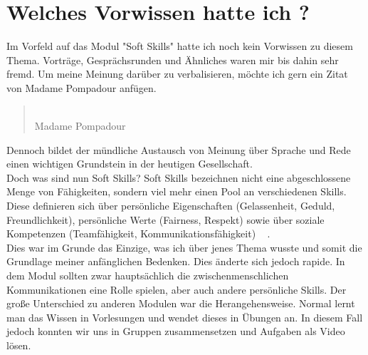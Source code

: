 \chapter{Welches Vorwissen hatte ich ? }

Im Vorfeld auf das Modul "Soft Skills" hatte ich noch kein Vorwissen zu diesem Thema. Vorträge, Gesprächsrunden und Ähnliches waren mir bis dahin sehr fremd. Um meine Meinung darüber zu verbalisieren, möchte ich gern ein Zitat von Madame Pompadour anfügen.

\begin{quote}
	 \dq\\
     Madame Pompadour
\end{quote}

Dennoch bildet der mündliche Austausch von Meinung über Sprache und Rede einen wichtigen Grundstein in der heutigen Gesellschaft.  \\

Doch was sind nun Soft Skills? 
Soft Skills bezeichnen nicht eine abgeschlossene Menge von Fähigkeiten, sondern viel mehr einen Pool an verschiedenen Skills. Diese definieren sich über persönliche Eigenschaften (Gelassenheit, Geduld, Freundlichkeit), persönliche Werte (Fairness, Respekt) sowie über soziale Kompetenzen (Teamfähigkeit, Kommunikationsfähigkeit)  ~\cite{SoSk} . \\

Dies war im Grunde das Einzige, was ich über jenes Thema wusste und somit die Grundlage meiner anfänglichen Bedenken. Dies änderte sich jedoch rapide.
 In dem Modul sollten zwar hauptsächlich die zwischenmenschlichen Kommunikationen eine Rolle spielen, aber auch andere persönliche Skills.
Der große Unterschied zu anderen Modulen war die Herangehensweise. Normal lernt man das Wissen in Vorlesungen und wendet dieses in Übungen an. In diesem Fall jedoch konnten wir uns in Gruppen zusammensetzen und Aufgaben als Video lösen. 